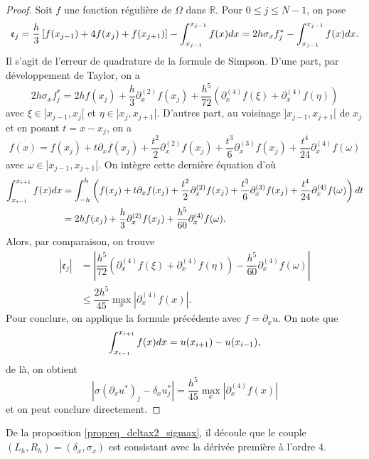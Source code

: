 \begin{itemize}
\begin{proof}
Soit $f$ une fonction régulière de $\Omega$ dans $\mathbb{R}$. Pour $0 \leq j \leq N-1$, on pose
\begin{equation}
\mathfrak{e}_j = \dfrac{h}{3} \left[ f(x_{j-1}) + 4 f(x_j) + f(x_{j+1}) \right] - \displaystyle\int_{x_{j-1}}^{x_{j-1}} f(x) dx = 2h \sigma_x f^*_j - \displaystyle\int_{x_{j-1}}^{x_{j-1}} f(x) dx.
\end{equation}
Il s'agit de l'erreur de quadrature de la formule de Simpson.
D'une part, par développement de Taylor, on a
\begin{equation}
2h \sigma_x f^*_j = 2h f(x_j) + \dfrac{h}{3}\partial_x^{(2)}f(x_j) + \dfrac{h^5}{72} \left( \partial_x^{(4)}f(\xi) + \partial_x^{(4)}f(\eta) \right) 
\end{equation}
avec $\xi \in ]x_{j-1}, x_j[$ et $\eta \in ]x_j, x_{j+1}[$.
D'autres part, au voisinage $]x_{j-1}, x_{j+1}[$ de $x_j$ et en posant $t=x-x_j$, on a 
\begin{equation}
f(x) = f(x_j) + t \partial_x f(x_j) + \dfrac{t^2}{2} \partial_x^{(2)} f(x_j) + \dfrac{t^3}{6} \partial_x^{(3)} f(x_j) + \dfrac{t^4}{24} \partial_x^{(4)} f(\omega)
\end{equation}
avec $\omega \in ]x_{j-1}, x_{j+1}[$. On intègre cette dernière équation d'où
\begin{align*}
\displaystyle\int_{x_{i-1}}^{x_{i+1}} f(x) dx & = \displaystyle\int_{-h}^h \left( f(x_j) + t \partial_x f(x_j) + \dfrac{t^2}{2} \partial_x^{(2)} f(x_j) + \dfrac{t^3}{6} \partial_x^{(3)} f(x_j) + \dfrac{t^4}{24} \partial_x^{(4)} f(\omega) \right) dt \\
	& = 2h f(x_j) + \dfrac{h}{3}\partial_x^{(2)}f(x_j) + \dfrac{h^5}{60}\partial_x^{(4)} f(\omega).
\end{align*}
Alors, par comparaison, on trouve
\begin{align*}
|\mathfrak{e}_j| & = |\dfrac{h^5}{72} \left( \partial_x^{(4)}f(\xi) + \partial_x^{(4)}f(\eta) \right)  - \dfrac{h^5}{60}\partial_x^{(4)} f(\omega)|  \\
	& \leq \dfrac{2 h^5}{45} \max_{x} |\partial_x^{(4)} f(x)|.
\end{align*}
Pour conclure, on applique la formule précédente avec $f = \partial_x u$. On note que 
\begin{equation}
\displaystyle\int_{x_{i-1}}^{x_{i+1}}f(x) dx = u(x_{i+1}) - u(x_{i-1}),
\end{equation}
de là, on obtient
\begin{equation}
|\sigma \left( \partial_x u^* \right)_j - \delta_x u^*_j | = \dfrac{h^5}{45}\max_{x} |\partial_x^{(4)} f(x)|
\end{equation}
et on peut conclure directement.
\end{proof}
De la proposition \ref{prop:eq_deltax2_sigmax}, il découle que le couple $(L_h, R_h) = (\delta_x, \sigma_x)$ est consistant avec la dérivée première à l'ordre $4$.
\end{itemize}

